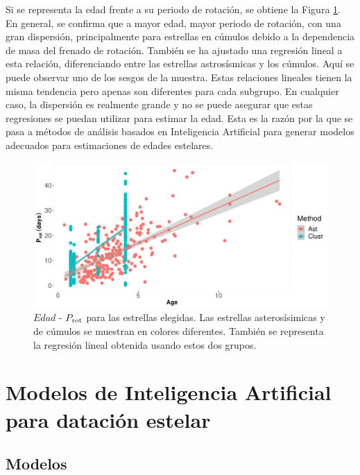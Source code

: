 Si se representa la edad frente a su periodo de rotación, se obtiene la Figura \ref{Fig:Age_rot}. En general, se confirma que a mayor edad, mayor periodo de rotación, con una gran dispersión, principalmente para estrellas en cúmulos debido a la dependencia de masa del frenado de rotación. También se ha ajustado una regresión lineal a esta relación, diferenciando entre las estrellas astrosísmicas y los cúmulos. Aquí se puede observar uno de los sesgos de la muestra. Estas relaciones lineales tienen la misma tendencia pero apenas son diferentes para cada subgrupo. En cualquier caso, la dispersión es realmente grande y no se puede asegurar que estas regresiones se puedan utilizar para estimar la edad. Esta es la razón por la que se pasa a métodos de análisis basados en Inteligencia Artificial para generar modelos adecuados para estimaciones de edades estelares.

\begin{figure}[H]
\begin{center}
 \includegraphics[width=0.8\linewidth]{Figuras/Age_Prot_embedded.pdf}
\end{center}
\caption{$Edad$ - $P_{\rm rot}$ para las estrellas elegidas. Las estrellas asterosísimicas y de cúmulos se muestran en colores diferentes. También se representa la regresión lineal obtenida usando estos dos grupos.}
 \label{Fig:Age_rot}
\end{figure}


\chapter{Modelos de Inteligencia Artificial para datación estelar} 
\section{Modelos}
\label{sec:models}

